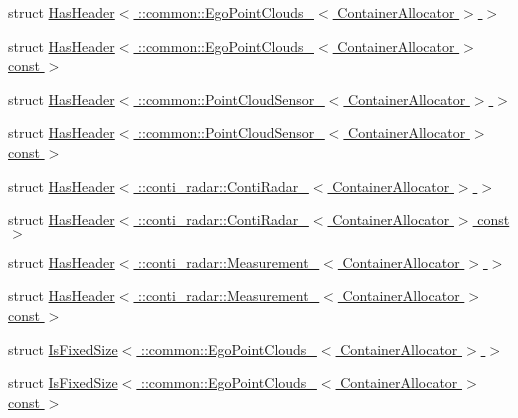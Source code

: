 \begin{DoxyCompactItemize}
\item 
struct \hyperlink{structros_1_1message__traits_1_1HasHeader_3_01_1_1common_1_1EgoPointClouds___3_01ContainerAllocator_01_4_01_4}{Has\+Header$<$ \+::common\+::\+Ego\+Point\+Clouds\+\_\+$<$ Container\+Allocator $>$ $>$}
\item 
struct \hyperlink{structros_1_1message__traits_1_1HasHeader_3_01_1_1common_1_1EgoPointClouds___3_01ContainerAllocator_01_4_01const_01_4}{Has\+Header$<$ \+::common\+::\+Ego\+Point\+Clouds\+\_\+$<$ Container\+Allocator $>$ const $>$}
\item 
struct \hyperlink{structros_1_1message__traits_1_1HasHeader_3_01_1_1common_1_1PointCloudSensor___3_01ContainerAllocator_01_4_01_4}{Has\+Header$<$ \+::common\+::\+Point\+Cloud\+Sensor\+\_\+$<$ Container\+Allocator $>$ $>$}
\item 
struct \hyperlink{structros_1_1message__traits_1_1HasHeader_3_01_1_1common_1_1PointCloudSensor___3_01ContainerAllocator_01_4_01const_01_4}{Has\+Header$<$ \+::common\+::\+Point\+Cloud\+Sensor\+\_\+$<$ Container\+Allocator $>$ const $>$}
\item 
struct \hyperlink{structros_1_1message__traits_1_1HasHeader_3_01_1_1conti__radar_1_1ContiRadar___3_01ContainerAllocator_01_4_01_4}{Has\+Header$<$ \+::conti\+\_\+radar\+::\+Conti\+Radar\+\_\+$<$ Container\+Allocator $>$ $>$}
\item 
struct \hyperlink{structros_1_1message__traits_1_1HasHeader_3_01_1_1conti__radar_1_1ContiRadar___3_01ContainerAllocator_01_4_01const_01_4}{Has\+Header$<$ \+::conti\+\_\+radar\+::\+Conti\+Radar\+\_\+$<$ Container\+Allocator $>$ const $>$}
\item 
struct \hyperlink{structros_1_1message__traits_1_1HasHeader_3_01_1_1conti__radar_1_1Measurement___3_01ContainerAllocator_01_4_01_4}{Has\+Header$<$ \+::conti\+\_\+radar\+::\+Measurement\+\_\+$<$ Container\+Allocator $>$ $>$}
\item 
struct \hyperlink{structros_1_1message__traits_1_1HasHeader_3_01_1_1conti__radar_1_1Measurement___3_01ContainerAllocator_01_4_01const_01_4}{Has\+Header$<$ \+::conti\+\_\+radar\+::\+Measurement\+\_\+$<$ Container\+Allocator $>$ const $>$}
\item 
struct \hyperlink{structros_1_1message__traits_1_1IsFixedSize_3_01_1_1common_1_1EgoPointClouds___3_01ContainerAllocator_01_4_01_4}{Is\+Fixed\+Size$<$ \+::common\+::\+Ego\+Point\+Clouds\+\_\+$<$ Container\+Allocator $>$ $>$}
\item 
struct \hyperlink{structros_1_1message__traits_1_1IsFixedSize_3_01_1_1common_1_1EgoPointClouds___3_01ContainerAllocator_01_4_01const_01_4}{Is\+Fixed\+Size$<$ \+::common\+::\+Ego\+Point\+Clouds\+\_\+$<$ Container\+Allocator $>$ const $>$}

\end{DoxyCompactItemize}
